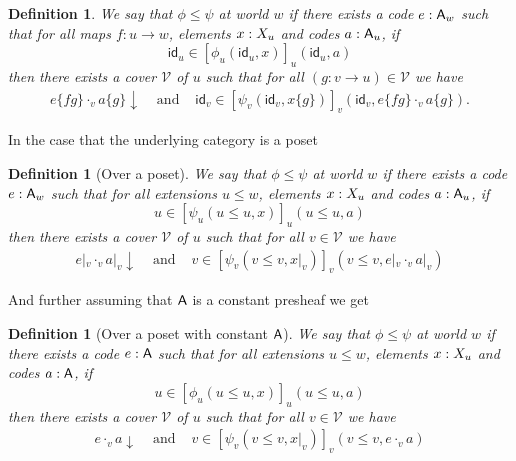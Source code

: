 \documentclass[11pt]{article}
\newtheorem{defn}[thrm]{Definition}
\begin{document}
\begin{defn}
  We say that \(\phi \leq \psi\) at world \(w\) if there exists a code
  \(e : \mathsf{A}_{w}\) such that for all maps \(f : u \to w\), elements
  \(x : X_{u}\) and codes \(a : \mathsf{A}_{u}\), if
  \[
    \mathsf{id}_{u} \in [\phi_{u}(\mathsf{id}_{u}, x)]_{u}(\mathsf{id}_{u},a)
  \]
  then there exists a cover \(\mathcal{V}\) of \(u\) such that for all
  \((g : v \to u) \in \mathcal{V}\) we have
  \[\begin{array}{ccc}
  e\{fg\} \cdot_{v} a\{g\} \downarrow &\text{ and }&
  \mathsf{id}_{v} \in [\psi_{v}(\mathsf{id}_{v}, x\{g\})]_{v}(\mathsf{id}_{v},e\{fg\} \cdot_{v} a\{g\}).
  \end{array}\]
\end{defn}

In the case that the underlying category is a poset
%
\begin{defn}[Over a poset]
  We say that \(\phi \leq \psi\) at world \(w\) if there exists a code
  \(e : \mathsf{A}_{w}\) such that for all extensions \(u \leq w\), elements
  \(x : X_{u}\) and codes \(a : \mathsf{A}_{u}\), if
  \[
    u \in [\psi_{u}(u\leq u, x)]_{u}(u \leq u,a)
  \]
  then there exists a cover \(\mathcal{V}\) of \(u\) such that for all \(v \in \mathcal{V}\) we
  have
  \[\begin{array}{ccc}
    e|_{v} \cdot_{v} a|_{v} \downarrow &\text{ and }&
    v \in [\psi_{v}(v\leq v, x|_{v})]_{v}(v \leq v,e|_{v} \cdot_{v} a|_{v})
  \end{array}\]
\end{defn}

And further assuming that \(\mathsf{A}\) is a constant presheaf we get
%
\begin{defn}[Over a poset with constant \(\mathsf{A}\)]
  We say that \(\phi \leq \psi\) at world \(w\) if there exists a code
  \(e : \mathsf{A}\) such that for all extensions \(u \leq w\), elements
  \(x : X_{u}\) and codes \(a : \mathsf{A}\), if
  \[
    u \in [\phi_{u}(u\leq u, x)]_{u}(u \leq u,a)
  \]
  then there exists a cover \(\mathcal{V}\) of \(u\) such that for all \(v \in \mathcal{V}\) we
  have
  \[\begin{array}{ccc}
    e \cdot_{v} a \downarrow &\text{ and }&
    v \in [\psi_{v}(v\leq v, x|_{v})]_{v}(v \leq v,e \cdot_{v} a)
  \end{array}\]
\end{defn}
\end{document}
